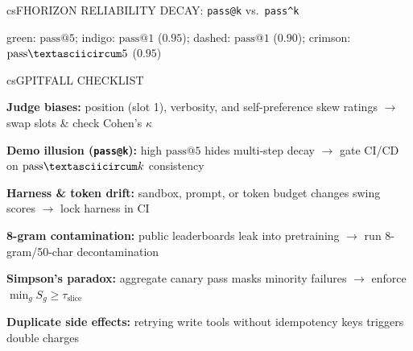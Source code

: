 \documentclass[../../../../master.tex]{subfiles}
\begin{document}
\begin{cscolumns}
\begin{cscard}{csF}{HORIZON RELIABILITY DECAY: \texttt{pass@k} vs.\ \texttt{pass\textasciicircum k}}
  \centering
  \par
  {\scriptsize green: $\mathrm{pass@}5$; indigo: $\mathrm{pass@}1$ ($0.95$); dashed: $\mathrm{pass@}1$ ($0.90$); crimson: $\mathrm{pass\textasciicircum}5$ ($0.95$)}
\end{cscard}
\columnbreak

\begin{cscard}{csG}{PITFALL CHECKLIST}
  \begin{csbul}
    \item \textbf{Judge biases:} position (slot 1), verbosity, and self-preference skew ratings $\to$ swap slots \& check Cohen's $\kappa$
    \item \textbf{Demo illusion (\texttt{pass@k}):} high $\mathrm{pass@}5$ hides multi-step decay $\to$ gate CI/CD on $\mathrm{pass\textasciicircum}k$ consistency
    \item \textbf{Harness \& token drift:} sandbox, prompt, or token budget changes swing scores $\to$ lock harness in CI
    \item \textbf{8-gram contamination:} public leaderboards leak into pretraining $\to$ run 8-gram/50-char decontamination
    \item \textbf{Simpson's paradox:} aggregate canary pass masks minority failures $\to$ enforce $\min_g S_g\ge\tau_{\mathrm{slice}}$
    \item \textbf{Duplicate side effects:} retrying write tools without idempotency keys triggers double charges
  \end{csbul}
\end{cscard}


\end{cscolumns}
\end{document}
